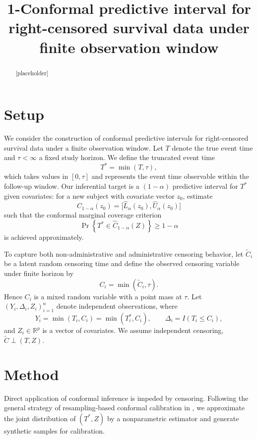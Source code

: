 \documentclass[11pt]{article}
\title{1-Conformal predictive interval for right-censored survival data under finite observation window}
\author{}
\date{}
\begin{document}
\maketitle

\begin{abstract}
[placeholder]
\end{abstract}






\section{Setup}
We consider the construction of conformal predictive intervals for right-censored
survival data under a finite observation window.
Let $T$ denote the true event time and $\tau<\infty$ a fixed study horizon.
We define the truncated event time
\[
T^* = \min(T,\tau),
\]
which takes values in $[0,\tau]$ and represents the event time observable within
the follow-up window.
Our inferential target is a $(1-\alpha)$ predictive interval for $T^*$ given covariates:
for a new subject with covariate vector $z_0$, estimate
\[
\widehat C_{1-\alpha}(z_0)=\big[\widehat L_\alpha(z_0),\widehat U_\alpha(z_0)\big]
\]
such that the conformal marginal coverage criterion
\[
\Pr\!\left\{T^* \in \widehat C_{1-\alpha}(Z)\right\}\ge 1-\alpha
\]
is achieved approximately.

To capture both non-administrative and administrative censoring behavior, let $\widetilde C_i$ be a latent random censoring time and define the observed
censoring variable under finite horizon by
\[
C_i = \min(\widetilde C_i,\tau).
\]
Hence $C_i$ is a mixed random variable with a point mass at $\tau$.
Let $(Y_i,\Delta_i,Z_i)_{i=1}^n$ denote independent observations, where
\[
Y_i = \min(T_i, C_i) = \min(T_i^*, C_i), \qquad
\Delta_i = I(T_i \le C_i),
\]
and $Z_i \in \mathbb R^p$ is a vector of covariates.
We assume independent censoring,
$\widetilde C \perp (T,Z)$.

\section{Method}

Direct application of conformal inference is impeded by censoring.
Following the general strategy of resampling-based conformal calibration in \citet{qin_conformal_2025}, we approximate the joint distribution of $(T^*,Z)$ by a nonparametric estimator and generate synthetic samples for calibration.
\end{document}
